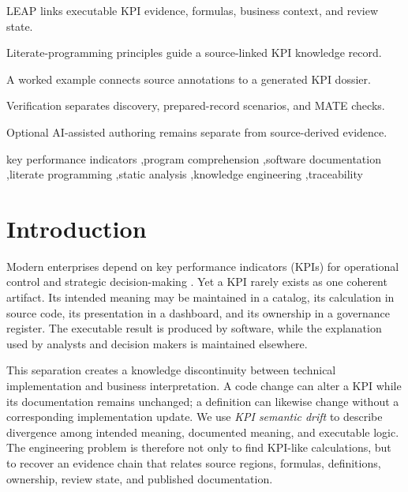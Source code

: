 \documentclass[a4paper,fleqn]{cas-dc}
\begin{document}
\begin{highlights}
  \item LEAP links executable KPI evidence, formulas, business context, and review state.
  \item Literate-programming principles guide a source-linked KPI knowledge record.
  \item A worked example connects source annotations to a generated KPI dossier.
  \item Verification separates discovery, prepared-record scenarios, and MATE checks.
  \item Optional AI-assisted authoring remains separate from source-derived evidence.

\end{highlights}

\begin{keywords}
key performance indicators \sep program comprehension \sep software documentation \sep literate programming \sep static analysis \sep knowledge engineering \sep traceability
\end{keywords}

\maketitle

\section{Introduction}

Modern enterprises depend on key performance indicators (KPIs) for operational control and strategic decision-making \citep{Parmenter2015,Kaplan1996}. Yet a KPI rarely exists as one coherent artifact. Its intended meaning may be maintained in a catalog, its calculation in source code, its presentation in a dashboard, and its ownership in a governance register. The executable result is produced by software, while the explanation used by analysts and decision makers is maintained elsewhere.

This separation creates a knowledge discontinuity between technical implementation and business interpretation. A code change can alter a KPI while its documentation remains unchanged; a definition can likewise change without a corresponding implementation update. We use \emph{KPI semantic drift} to describe divergence among intended meaning, documented meaning, and executable logic. The engineering problem is therefore not only to find KPI-like calculations, but to recover an evidence chain that relates source regions, formulas, definitions, ownership, review state, and published documentation.
\end{document}
